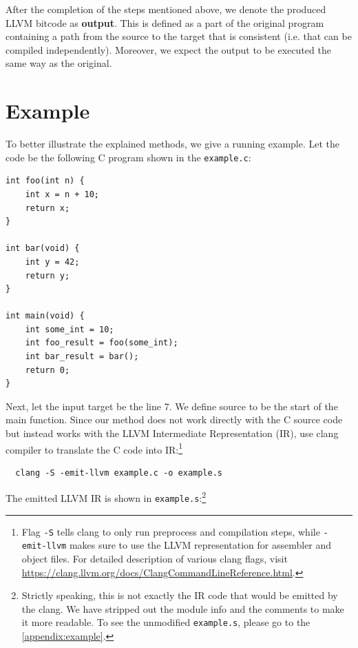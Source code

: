 \documentclass[12pt, twoside]{fithesis2}
\renewcommand{\_}{\leavevmode \kern0.07em\vbox{\hrule width0.4em}}
\begin{document}
After the completion of the steps mentioned above, we denote the produced LLVM
bitcode as \textbf{output}.
This is defined as a part of the original program containing a path from the
source to the target that is consistent (i.e. that can be compiled
independently).
Moreover, we expect the output to be executed the same way as the original.


\section{Example}
\label{sec:method_example}

To better illustrate the explained methods, we give a running example.
Let the code be the following C program shown in the
\texttt{example.c}:

\begin{verbatim}
int foo(int n) {
    int x = n + 10;
    return x;
}

int bar(void) {
    int y = 42;
    return y;
}

int main(void) {
    int some_int = 10;
    int foo_result = foo(some_int);
    int bar_result = bar();
    return 0;
}
\end{verbatim}

Next, let the input target be the line 7.
We define source to be the start of the main function.
Since our method does not work directly with the C source code but instead
works with the LLVM Intermediate Representation (IR), use clang compiler to
translate the C code into IR:\footnote {
Flag \texttt{-S} tells clang to only run preprocess and
compilation steps, while \texttt{-emit-llvm} makes sure to use the LLVM
representation for assembler and object files. For detailed description of
various clang flags, visit
\url{https://clang.llvm.org/docs/ClangCommandLineReference.html}.
}

\begin{verbatim}
  clang -S -emit-llvm example.c -o example.s
\end{verbatim}

The emitted LLVM IR is shown in \texttt{example.s}:\footnote{
Strictly speaking, this is not exactly the IR code that would be emitted by the
clang. We have stripped out the module info and the comments to make it more
readable. To see the unmodified \texttt{example.s}, please go to the
\autoref{appendix:example}.
}
\end{document}
